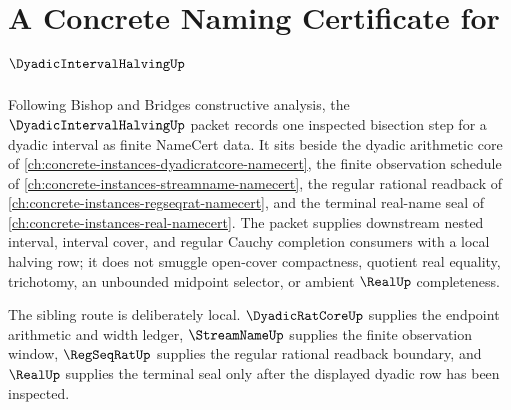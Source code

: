 \chapter{A Concrete Naming Certificate for $\DyadicIntervalHalvingUp$}
\label{ch:concrete-instances-dyadic-interval-halving-namecert}

Following Bishop and Bridges constructive analysis, the $\DyadicIntervalHalvingUp$ packet records one inspected bisection step for a dyadic interval as finite NameCert data. It sits beside the dyadic arithmetic core of \autoref{ch:concrete-instances-dyadicratcore-namecert}, the finite observation schedule of \autoref{ch:concrete-instances-streamname-namecert}, the regular rational readback of \autoref{ch:concrete-instances-regseqrat-namecert}, and the terminal real-name seal of \autoref{ch:concrete-instances-real-namecert}. The packet supplies downstream nested interval, interval cover, and regular Cauchy completion consumers with a local halving row; it does not smuggle open-cover compactness, quotient real equality, trichotomy, an unbounded midpoint selector, or ambient $\RealUp$ completeness.

The sibling route is deliberately local. $\DyadicRatCoreUp$ supplies the endpoint arithmetic and width ledger, $\StreamNameUp$ supplies the finite observation window, $\RegSeqRatUp$ supplies the regular rational readback boundary, and $\RealUp$ supplies the terminal seal only after the displayed dyadic row has been inspected.

